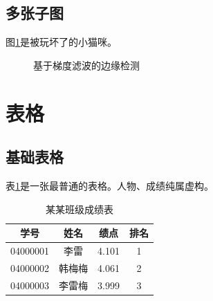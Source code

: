 \documentclass[a4paper, 12pt, centering, AutoFakeBold]{article}
\begin{document}
\subsection{多张子图}
图\ref{Fig.filt}是被玩坏了的小猫咪。
\begin{figure}[H]
    \centering
    \caption{基于梯度滤波的边缘检测}
    \label{Fig.filt}
\end{figure}


\section{表格}
\subsection{基础表格}
表\ref{Tab.GPA}是一张最普通的表格。人物、成绩纯属虚构。
\begin{table}[H]
    \centering
    \caption{某某班级成绩表}
    \label{Tab.GPA}
    \begin{tabular}{|c|c|c|c|}
        \hline
        学号     & 姓名   & 绩点 & 排名 \\
        \hline
        04000001 & 李雷   & 4.101 & 1 \\
        \hline
        04000002 & 韩梅梅 & 4.061 & 2 \\
        \hline
        04000003 & 李雷梅 & 3.999 & 3 \\
        \hline
    \end{tabular}
\end{table}
\end{document}
